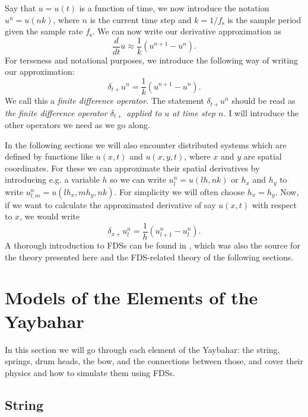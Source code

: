 \documentclass{article}
\begin{document}
Say that $u = u(t)$ is a function of time, we now introduce the notation $u^n = u(nk)$, where $n$ is the current time step and $k = 1/f_\text{s}$ is the sample period given the sample rate $f_\text{s}$.
We can now write our derivative approximation as
\begin{equation}
  \frac{d}{dt} u \approx \frac{1}{k} (u^{n+1} - u^{n}).
\end{equation}
For terseness and notational purposes, we introduce the following way of writing our approximation:
\begin{equation}
  \label{eq:dtf}
  \delta_{t+} u^n = \frac{1}{k} (u^{n+1} - u^{n}).
\end{equation}
We call this a \textit{finite difference operator}.
The statement $\delta_{t+}u^n$ should be read as \textit{the finite difference operator $\delta_{t+}$ applied to $u$ at time step $n$.}
I will introduce the other operators we need as we go along.

In the following sections we will also encounter distributed systems which are defined by functions like $u(x, t)$ and $u(x, y, t)$, where $x$ and $y$ are spatial coordinates.
For these we can approximate their spatial derivatives by introducing e.g. a variable $h$ so we can write $u^n_l = u(lh, nk)$ or $h_x$ and $h_y$ to write $u^n_{l, m} = u(lh_x, mh_y, nk)$. For simplicity we will often choose $h_x = h_y$.
Now, if we want to calculate the approximated derivative of say $u(x, t)$ with respect to $x$, we would write
\begin{equation}
  \delta_{x+} u^n_l = \frac{1}{h} (u^n_{l+1} - u^n_{l}).
\end{equation}
A thorough introduction to FDSs can be found in \cite{bilbao_numerical_2009}, which was also the source for the theory presented here and the FDS-related theory of the following sections.

\section{Models of the Elements of the Yaybahar}
\label{sec:elements}

In this section we will go through each element of the Yaybahar: the string, springs, drum heads, the bow, and the connections between those, and cover their physics and how to simulate them using FDSs.

\subsection{String}
\label{sec:string}
\end{document}
